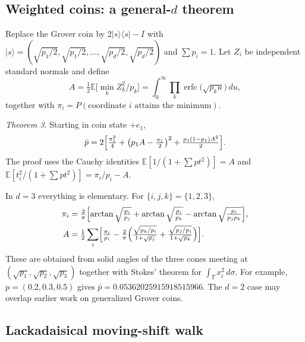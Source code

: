 \documentclass[aps,pra,10pt,twocolumn,superscriptaddress,nofootinbib]{revtex4-2}
\newcommand{\E}{\mathbb{E}}
\newcommand{\pbar}{\bar{p}}
\newcommand{\erfc}{\operatorname{erfc}}
\begin{document}
\subsection{Weighted coins: a general-$d$ theorem}

Replace the Grover coin by $2|s\rangle\langle s|-I$ with
$|s\rangle=(\sqrt{p_1/2},\sqrt{p_1/2},\dots,\sqrt{p_d/2},\sqrt{p_d/2})$ and $\sum p_i=1$. Let $Z_i$ be
independent standard normals and define
\begin{equation}
A=\tfrac12\E\bigl[\min_kZ_k^2/p_k\bigr]=\int_0^\infty\prod_k\erfc\bigl(\sqrt{p_ku}\bigr)\,du,
\end{equation}
together with $\pi_i=P(\text{coordinate $i$ attains the minimum})$.

\emph{Theorem 3.} Starting in coin state $+e_1$,
\begin{equation}
\pbar=2\Bigl[\tfrac{\pi_1^2}4+\bigl(p_1A-\tfrac{\pi_1}2\bigr)^2+\tfrac{p_1(1-p_1)A^2}2\Bigr].
\end{equation}
The proof uses the Cauchy identities $\E[1/(1+\sum p t^2)]=A$ and
$\E[t_i^2/(1+\sum pt^2)]=\pi_i/p_i-A$.

In $d=3$ everything is elementary. For $\{i,j,k\}=\{1,2,3\}$,
\begin{align}
\pi_i&=\tfrac2\pi\Bigl[\arctan\sqrt{\tfrac{p_i}{p_j}}+\arctan\sqrt{\tfrac{p_i}{p_k}}
-\arctan\sqrt{\tfrac{p_i}{p_jp_k}}\Bigr],\\
A&=\tfrac12\sum_i\Bigl[\tfrac{\pi_i}{p_i}-\tfrac2\pi\Bigl(\tfrac{\sqrt{p_k/p_i}}{1+\sqrt{p_j}}
+\tfrac{\sqrt{p_j/p_i}}{1+\sqrt{p_k}}\Bigr)\Bigr].
\end{align}
These are obtained from solid angles of the three cones meeting at $(\sqrt{p_1},\sqrt{p_2},\sqrt{p_3})$
together with Stokes' theorem for $\int_Tx_i^2\,d\sigma$. For example, $p=(0.2,0.3,0.5)$ gives
$\pbar=0.05362025915918515966$. The $d=2$ case may overlap earlier work on generalized Grover coins.

\subsection{Lackadaisical moving-shift walk}
\end{document}
